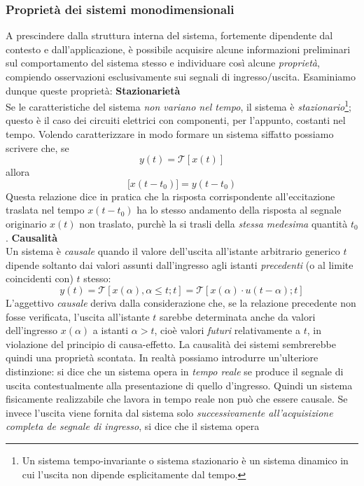 \documentclass[12pt,oneside,openany]{memoir}
\numberwithin{equation}{subsection}
\begin{document}
\subsubsection{Propriet\`a dei sistemi monodimensionali}
A prescindere dalla struttura interna del sistema, fortemente dipendente dal
contesto e dall'applicazione, \`e possibile acquisire alcune informazioni
preliminari sul comportamento del sistema stesso e individuare cos\`i alcune
\textit{propriet\`a}, compiendo osservazioni esclusivamente sui segnali di
ingresso/uscita. Esaminiamo dunque queste propriet\`a:
\bigbreak
\noindent
\textbf{Stazionariet\`a}\\
Se le caratteristiche del sistema \textit{non variano nel tempo}, il sistema \`e
\textit{stazionario}\footnote{Un sistema tempo-invariante o sistema stazionario
\`e un sistema dinamico in cui l'uscita non dipende esplicitamente dal tempo.};
questo \`e il caso dei circuiti elettrici con componenti,
per l'appunto, costanti nel tempo. Volendo caratterizzare in modo formare un
sistema siffatto possiamo scrivere che, se
\[
    y(t) = \mathcal{T}[x(t)]
\]
allora
\[
    \mathcal[x(t - t_0)] = y(t - t_0)
\]
Questa relazione dice in pratica che la risposta corrispondente all'eccitazione
traslata nel tempo $x(t - t_0)$ ha lo stesso andamento della risposta al segnale
originario $x(t)$ non traslato, purch\`e la si trasli della \textit{stessa
medesima} quantit\`a $t_0$.
\bigbreak
\noindent
\textbf{Causalit\`a}\\
Un sistema \`e \textit{causale} quando il valore dell'uscita all'istante
arbitrario generico $t$ dipende soltanto dai valori assunti dall'ingresso agli
istanti \textit{precedenti} (o al limite coincidenti con) $t$ stesso:
\[
    y(t) = \mathcal{T}[x(\alpha), \alpha \leq t; t] = \mathcal{T}[x(\alpha)
    \cdot u(t - \alpha); t]
\]
L'aggettivo \textit{causale} deriva dalla considerazione che, se la relazione
precedente non fosse verificata, l'uscita all'istante $t$ sarebbe determinata
anche da valori dell'ingresso $x(\alpha)$ a istanti $\alpha > t$, cio\`e valori
\textit{futuri} relativamente a $t$, in violazione del principio di
causa-effetto.
\bigbreak
La causalit\`a dei sistemi sembrerebbe quindi una propriet\`a scontata. In
realt\`a possiamo introdurre un'ulteriore distinzione: si dice che un sistema
opera in \textit{tempo reale} se produce il segnale di uscita contestualmente
alla presentazione di quello d'ingresso. Quindi un sistema fisicamente
realizzabile che lavora in tempo reale non pu\`o che essere causale. Se invece
l'uscita viene fornita dal sistema solo \textit{successivamente
all'acquisizione completa de segnale di ingresso}, si dice che il sistema opera
\end{document}
